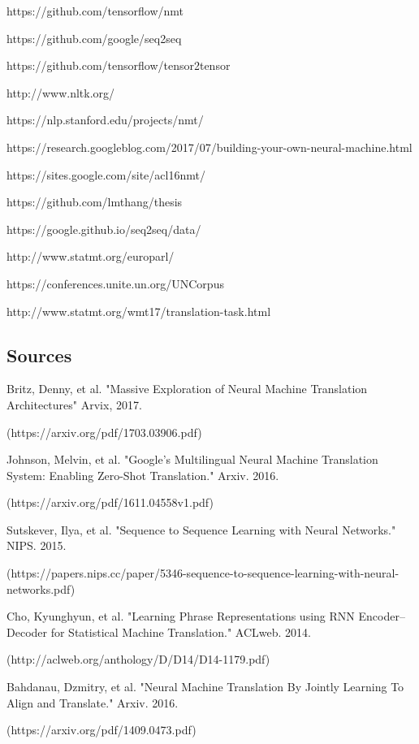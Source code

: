 \documentclass[10pt,a4paper]{article}
\begin{document}
https://github.com/tensorflow/nmt

https://github.com/google/seq2seq

https://github.com/tensorflow/tensor2tensor

http://www.nltk.org/

https://nlp.stanford.edu/projects/nmt/

https://research.googleblog.com/2017/07/building-your-own-neural-machine.html

https://sites.google.com/site/acl16nmt/

https://github.com/lmthang/thesis

https://google.github.io/seq2seq/data/

http://www.statmt.org/europarl/

https://conferences.unite.un.org/UNCorpus

http://www.statmt.org/wmt17/translation-task.html

\subsection{Sources}

Britz, Denny, et al. "Massive Exploration of Neural Machine Translation Architectures" Arvix, 2017.

(https://arxiv.org/pdf/1703.03906.pdf)
\newline

Johnson, Melvin, et al. "Google’s Multilingual Neural Machine Translation System: Enabling Zero-Shot Translation." Arxiv. 2016.

(https://arxiv.org/pdf/1611.04558v1.pdf)
\newline

Sutskever, Ilya, et al. "Sequence to Sequence Learning with Neural Networks." NIPS. 2015.

(https://papers.nips.cc/paper/5346-sequence-to-sequence-learning-with-neural-networks.pdf)
\newline

Cho, Kyunghyun, et al. "Learning Phrase Representations using RNN Encoder–Decoder for Statistical Machine Translation." ACLweb. 2014.

(http://aclweb.org/anthology/D/D14/D14-1179.pdf)
\newline

Bahdanau, Dzmitry, et al. "Neural Machine Translation By Jointly Learning To Align and Translate." Arxiv. 2016.

(https://arxiv.org/pdf/1409.0473.pdf)
\newline
\end{document}

